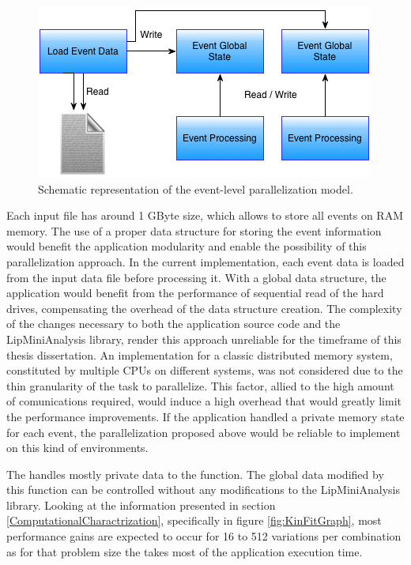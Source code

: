 \begin{figure}[!htp]
	\begin{center}
		\includegraphics[scale=0.7]{../../common/img/2global_states_par.png}
		\caption{Schematic representation of the event-level parallelization model.}
		\label{fig:EventParallelization}
	\end{center}
\end{figure}

Each input file has around 1 GByte size, which allows to store all events on RAM memory. The use of a proper data structure for storing the event information would benefit the application modularity and enable the possibility of this parallelization approach. In the current implementation, each event data is loaded from the input data file before processing it. With a global data structure, the application would benefit from the performance of sequential read of the hard drives, compensating the overhead of the data structure creation. The complexity of the changes necessary to both the application source code and the LipMiniAnalysis library, render this approach unreliable for the timeframe of this thesis dissertation. An implementation for a classic distributed memory system, constituted by multiple CPUs on different systems, was not considered due to the thin granularity of the task to parallelize. This factor, allied to the high amount of comunications required, would induce a high overhead that would greatly limit the performance improvements. If the application handled a private memory state for each event, the parallelization proposed above would be reliable to implement on this kind of environments.

The \ttDilepKinFit handles mostly private data to the function. The global data modified by this function can be controlled without any modifications to the LipMiniAnalysis library. Looking at the information presented in section \ref{ComputationalCharactrization}, specifically in figure \ref{fig:KinFitGraph}, most performance gains are expected to occur for 16 to 512 variations per combination as for that problem size the \ttDilepKinFit takes most of the application execution time.

